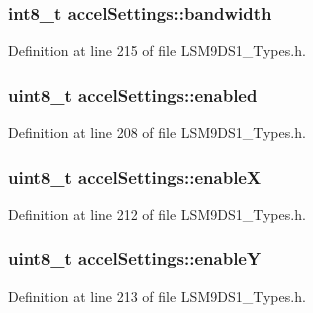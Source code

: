 \subsubsection[{\texorpdfstring{bandwidth}{bandwidth}}]{\setlength{\rightskip}{0pt plus 5cm}int8\+\_\+t accel\+Settings\+::bandwidth}\hypertarget{structaccel_settings_ab64c80f62ecfeb3041744febaed9407b}{}\label{structaccel_settings_ab64c80f62ecfeb3041744febaed9407b}


Definition at line 215 of file L\+S\+M9\+D\+S1\+\_\+\+Types.\+h.

\subsubsection[{\texorpdfstring{enabled}{enabled}}]{\setlength{\rightskip}{0pt plus 5cm}uint8\+\_\+t accel\+Settings\+::enabled}\hypertarget{structaccel_settings_a6ecaf7abfbaf7e74c6986fd93798ad4b}{}\label{structaccel_settings_a6ecaf7abfbaf7e74c6986fd93798ad4b}


Definition at line 208 of file L\+S\+M9\+D\+S1\+\_\+\+Types.\+h.

\subsubsection[{\texorpdfstring{enableX}{enableX}}]{\setlength{\rightskip}{0pt plus 5cm}uint8\+\_\+t accel\+Settings\+::enableX}\hypertarget{structaccel_settings_a8cd5546cda8657ad2405d378fc815b9a}{}\label{structaccel_settings_a8cd5546cda8657ad2405d378fc815b9a}


Definition at line 212 of file L\+S\+M9\+D\+S1\+\_\+\+Types.\+h.

\subsubsection[{\texorpdfstring{enableY}{enableY}}]{\setlength{\rightskip}{0pt plus 5cm}uint8\+\_\+t accel\+Settings\+::enableY}\hypertarget{structaccel_settings_a3f9ff5abfde83c5a59808faeb5ad4c6c}{}\label{structaccel_settings_a3f9ff5abfde83c5a59808faeb5ad4c6c}


Definition at line 213 of file L\+S\+M9\+D\+S1\+\_\+\+Types.\+h.

